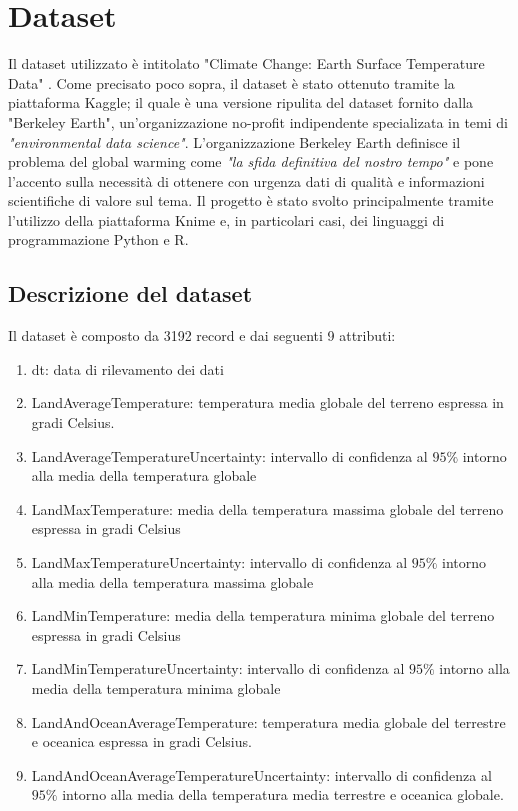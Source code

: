 \documentclass[12pt, a4paper, twocolumn]{article} %
\begin{document}

\section{Dataset}
Il dataset utilizzato è intitolato "Climate Change: Earth Surface Temperature Data" \cite{dataset}. %
Come precisato poco sopra, il dataset è stato ottenuto tramite la piattaforma Kaggle; il quale è una versione ripulita del dataset fornito dalla "Berkeley Earth", un'organizzazione no-profit indipendente specializata in temi di \textit{"environmental data science"}.
L'organizzazione Berkeley Earth definisce il problema del global warming come \textit{"la sfida definitiva del nostro tempo"} e pone l'accento sulla necessità di ottenere con urgenza dati di qualità e informazioni scientifiche di valore sul tema.
Il progetto è stato svolto principalmente tramite l'utilizzo della piattaforma Knime e, in particolari casi, dei linguaggi di programmazione Python e R.

\subsection{Descrizione del dataset}
Il dataset è composto da 3192 record e dai seguenti 9 attributi:
\begin{enumerate}
 

	\item dt: data di rilevamento dei dati
	\item LandAverageTemperature: temperatura media globale del terreno espressa in gradi Celsius.
	\item LandAverageTemperatureUncertainty: intervallo di confidenza al $95\%$ intorno alla media della temperatura globale
	\item LandMaxTemperature: media della temperatura massima globale del terreno espressa in gradi Celsius
	\item LandMaxTemperatureUncertainty:  intervallo di confidenza al $95\%$ intorno alla media della temperatura massima globale
	\item LandMinTemperature: media della temperatura minima globale del terreno espressa in gradi Celsius
	\item LandMinTemperatureUncertainty: intervallo di confidenza al $95\%$ intorno alla media della temperatura minima globale
	\item LandAndOceanAverageTemperature: temperatura media globale del terrestre e oceanica espressa in gradi Celsius.
	\item LandAndOceanAverageTemperatureUncertainty: intervallo di confidenza al $95\%$ intorno alla media della temperatura media terrestre e oceanica globale.
\end{enumerate}
\end{document}
